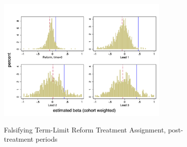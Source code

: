 \documentclass{beamer}
\begin{document}
\begin{frame}[label=falsification, noframenumbering]
 
 \begin{figure}[h]  
\centering
\caption{Falsifying Term-Limit Reform Treatment Assignment, post-treatment periods} 
\label{fig:falsification}
  
\includegraphics[width=0.75\textwidth]{Figures_pres/falsification_post.png}
       \captionsetup{justification=centering}
       \\  
 
  \hyperlink{robustness}{} 
\end{figure} 
      
\end{frame}
\end{document}
